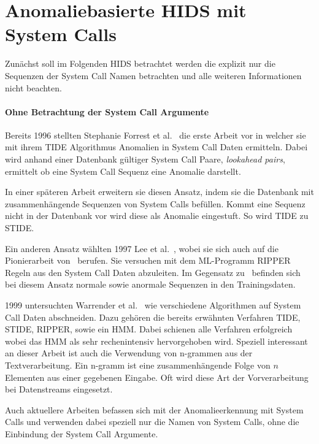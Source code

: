 \section{Anomaliebasierte HIDS mit System Calls}

    Zunächst soll im Folgenden \ac{HIDS} betrachtet werden die explizit nur die Sequenzen der System Call Namen betrachten und alle weiteren Informationen nicht beachten.

    \paragraph{Ohne Betrachtung der System Call Argumente}\label{sec:related_no_arg}
        Bereits 1996 stellten Stephanie Forrest et al.~\cite{FORREST} die erste Arbeit vor in welcher sie mit ihrem \ac{TIDE} Algorithmus Anomalien in System Call Daten ermitteln.
        Dabei wird anhand einer Datenbank gültiger System Call Paare, \textit{lookahead pairs}, ermittelt ob eine System Call Sequenz eine Anomalie darstellt.

        In einer späteren Arbeit erweitern sie diesen Ansatz, indem sie die Datenbank mit zusammenhängende Sequenzen von System Calls befüllen.
        Kommt eine Sequenz nicht in der Datenbank vor wird diese als Anomalie eingestuft.
        So wird \ac{TIDE} zu \ac{STIDE}.~\cite{STIDE}

        Ein anderen Ansatz wählten 1997 Lee et al.~\cite{LEE1997}, wobei sie sich auch auf die Pionierarbeit von~\cite{FORREST} berufen.
        Sie versuchen mit dem \ac{ML}-Programm \ac{RIPPER} Regeln aus den System Call Daten abzuleiten.
        Im Gegensatz zu~\cite{FORREST} befinden sich bei diesem Ansatz normale sowie anormale Sequenzen in den Trainingsdaten.

        1999 untersuchten Warrender et al.~\cite{STIDE_Alternatives} wie verschiedene Algorithmen auf System Call Daten abschneiden.
        Dazu gehören die bereits erwähnten Verfahren \ac{TIDE}, \ac{STIDE}, \ac{RIPPER}, sowie ein \ac{HMM}.
        Dabei schienen alle Verfahren erfolgreich wobei das \ac{HMM} als sehr rechenintensiv hervorgehoben wird.
        Speziell interessant an dieser Arbeit ist auch die Verwendung von n-grammen aus der Textverarbeitung.
        Ein n-gramm ist eine zusammenhängende Folge von $n$ Elementen aus einer gegebenen Eingabe.
        Oft wird diese Art der Vorverarbeitung bei Datenstreams eingesetzt.
 
        Auch aktuellere Arbeiten befassen sich mit der Anomalieerkennung mit System Calls und verwenden dabei speziell nur die Namen von System Calls, ohne die Einbindung der System Call Argumente.
    
